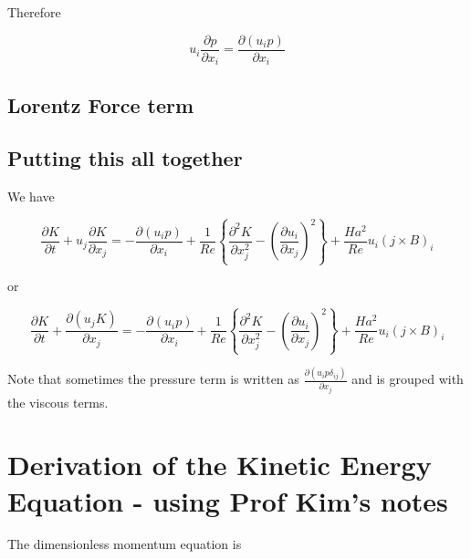 \documentclass[11pt]{article}
\begin{document}
Therefore

\begin{equation}
	u_i
	\frac{\partial p}{\partial x_i}
	=
	\frac{\partial (u_i p)}{\partial x_i}
\end{equation}

\subsection{Lorentz Force term}

\subsection{Putting this all together}
We have

\begin{equation}
	\frac{\partial K}{\partial t}
	+
	u_j \frac{\partial K}{\partial x_j}
	= 
	-
	\frac{\partial (u_i p)}{\partial x_i}
	+
	\frac{1}{Re}
	\left\{
	\frac{\partial^2 K}{\partial x_j^2}
	-
	\left( \frac{\partial u_i}{\partial x_j} \right)^2
	\right\}
	+
	\frac{Ha^2}{Re}
	u_i
	(j \times B)_i
\end{equation}

or

\begin{equation}
	\boxed{
	\frac{\partial K}{\partial t}
	+
	\frac{\partial (u_j K)}{\partial x_j}
	= 
	-
	\frac{\partial (u_i p)}{\partial x_i}
	+
	\frac{1}{Re}
	\left\{
	\frac{\partial^2 K}{\partial x_j^2}
	-
	\left( \frac{\partial u_i}{\partial x_j} \right)^2
	\right\}
	+
	\frac{Ha^2}{Re}
	u_i
	(j \times B)_i
	}
\end{equation}

Note that sometimes the pressure term is written as $\frac{\partial (u_i p \delta_{ij})}{\partial x_j}$ and is grouped with the viscous terms.

\section{Derivation of the Kinetic Energy Equation - using Prof Kim's notes}
The dimensionless momentum equation is

\end{document}
